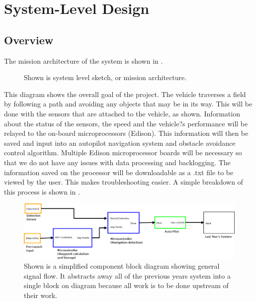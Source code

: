\chapter{System-Level Design}

	\section{Overview}
	
	The mission architecture of the system is shown in . 
\begin{figure}[h!]
\begin{center}
\caption[System Level Sketch]{Shown is system level sketch, or mission architecture.}
\label{SLsketch}
\end{center}
\end{figure}	
This diagram shows the overall goal of the project. The vehicle traverses a field by following a path and avoiding any objects that may be in its way.  This will be done with the sensors that are attached to the vehicle, as shown.  Information about the status of the sensors, the speed and the vehicle?s performance will be relayed to the on-board microprocessors (Edison).  This information will then be saved and input into an autopilot navigation system and obstacle avoidance control algorithm.  Multiple Edison microprocessor boards will be necessary so that we do not have any issues with data processing and backlogging.  The information saved on the processor will be downloadable as a .txt file to be viewed by the user.  This makes troubleshooting easier.  A simple breakdown of this process is shown in .
\begin{figure}[h!]
\begin{center}
\includegraphics[width=\textwidth]{Figures/RSL_Rover_BlockDiagram.png}
\caption[Component Block Diagram]{Shown is a simplified component block diagram showing general signal flow. It abstracts away all of the previous years system into a single block on diagram because all work is to be done upstream of their work.}
\label{Block}
\end{center}
\end{figure}
